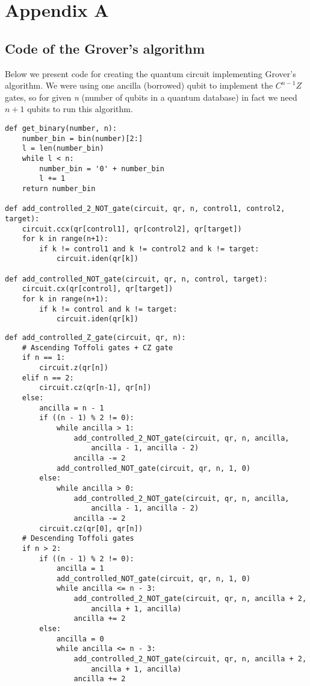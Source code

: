 \chapter{Appendix A}
\thispagestyle{chapterBeginStyle}
\label{appendixA}

\section{Code of the Grover's algorithm}

Below we present code for creating the quantum circuit implementing Grover's algorithm. We were using one ancilla (borrowed) qubit to implement the $C^{n - 1}Z$ gates, so for given \textit{n} (number of qubits in a quantum database) in fact we need $n + 1$ qubits to run this algorithm.

\begin{lstlisting}[frame=single]
def get_binary(number, n):
    number_bin = bin(number)[2:]
    l = len(number_bin)
    while l < n:
        number_bin = '0' + number_bin
        l += 1
    return number_bin

def add_controlled_2_NOT_gate(circuit, qr, n, control1, control2, target):
    circuit.ccx(qr[control1], qr[control2], qr[target])
    for k in range(n+1):
        if k != control1 and k != control2 and k != target:
            circuit.iden(qr[k])

def add_controlled_NOT_gate(circuit, qr, n, control, target):
    circuit.cx(qr[control], qr[target])
    for k in range(n+1):
        if k != control and k != target:
            circuit.iden(qr[k])
\end{lstlisting}    

\newpage
\begin{lstlisting}[frame=single]
def add_controlled_Z_gate(circuit, qr, n):
    # Ascending Toffoli gates + CZ gate
    if n == 1:
        circuit.z(qr[n])
    elif n == 2:
        circuit.cz(qr[n-1], qr[n])
    else:
        ancilla = n - 1
        if ((n - 1) % 2 != 0):
            while ancilla > 1:
                add_controlled_2_NOT_gate(circuit, qr, n, ancilla, 
                    ancilla - 1, ancilla - 2)
                ancilla -= 2
            add_controlled_NOT_gate(circuit, qr, n, 1, 0)
        else:
            while ancilla > 0:
                add_controlled_2_NOT_gate(circuit, qr, n, ancilla, 
                    ancilla - 1, ancilla - 2)
                ancilla -= 2
        circuit.cz(qr[0], qr[n])
    # Descending Toffoli gates
    if n > 2:
        if ((n - 1) % 2 != 0):
            ancilla = 1
            add_controlled_NOT_gate(circuit, qr, n, 1, 0)
            while ancilla <= n - 3:
                add_controlled_2_NOT_gate(circuit, qr, n, ancilla + 2, 
                    ancilla + 1, ancilla)
                ancilla += 2
        else:
            ancilla = 0
            while ancilla <= n - 3:
                add_controlled_2_NOT_gate(circuit, qr, n, ancilla + 2, 
                    ancilla + 1, ancilla)
                ancilla += 2
\end{lstlisting}

